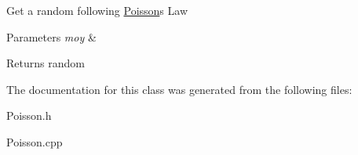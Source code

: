 Get a random following \hyperlink{classPoisson}{Poisson}\textquotesingle{}s Law 
\begin{DoxyParams}{Parameters}
{\em moy} & \\
\hline
\end{DoxyParams}
\begin{DoxyReturn}{Returns}
random 
\end{DoxyReturn}


The documentation for this class was generated from the following files\+:\begin{DoxyCompactItemize}
\item 
Poisson.\+h\item 
Poisson.\+cpp\end{DoxyCompactItemize}

